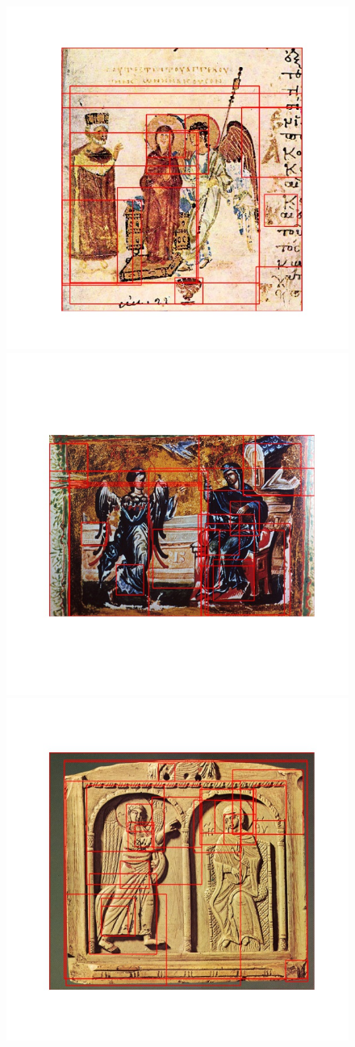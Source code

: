 \begin{figure}[htbp]
{			\centering
			\includegraphics[width=0.33\linewidth]{ca-annun1}
			\includegraphics[width=0.33\linewidth]{ca-annun2}
			\includegraphics[width=0.33\linewidth]{ca-annun3}


	}%
	
	
\end{figure}
